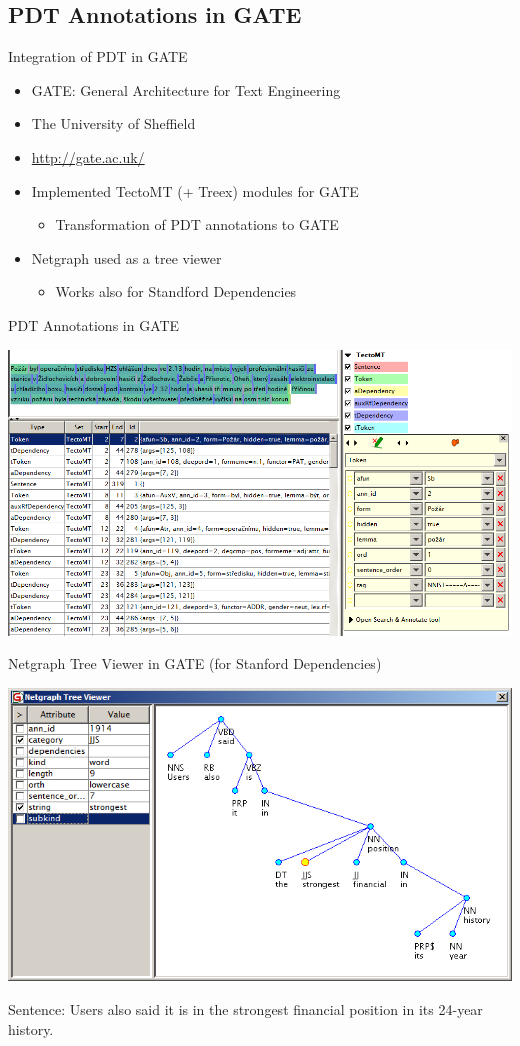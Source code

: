 \documentclass[xcolor=dvipsnames]{beamer}
\begin{document}
\subsection{PDT Annotations in GATE}

\begin{frame}{Integration of PDT in GATE}
\begin{itemize}
	\item GATE: General Architecture for Text Engineering
	\item The University of Sheffield
	\item \url{http://gate.ac.uk/}
	\medskip
	\item Implemented \alert{TectoMT (+ Treex) modules for GATE}
	\begin{itemize}
		\item Transformation of PDT annotations to GATE
	\end{itemize}
	\medskip
	\item \alert{Netgraph} used as a tree viewer
	\begin{itemize}
		\item Works also for Standford Dependencies 
	\end{itemize}
\end{itemize}
\end{frame}


\begin{frame}{PDT Annotations in GATE}
\centerline{\includegraphics[width=\hsize]{img/PDT_GATE}}
\end{frame}


\begin{frame}{Netgraph Tree Viewer in GATE (for Stanford Dependencies)}
\centerline{\includegraphics[width=\hsize]{img/netgraph_stanford}}
Sentence: Users also said it is in the strongest financial position in its 24-year history.
\end{frame}
\resetcolor
\end{document}
